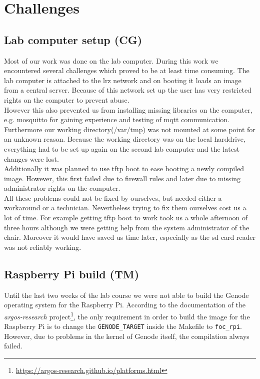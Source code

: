 \section{Challenges}
\label{sec:challenges}


\subsection{Lab computer setup (CG)}
Most of our work was done on the lab computer. During this work we encountered several challenges which proved to be at least time consuming. The lab computer is attached to the lrz network and on booting it loads an image from a central server. Because of this network set up the user has very restricted rights on the computer to prevent abuse.\\

However this also prevented us from installing missing libraries on the computer, e.g. mosquitto for gaining experience and testing of mqtt communication. Furthermore our working directory(/var/tmp) was not mounted at some point for an unknown reason. Because the working directory was on the local harddrive, everything had to be set up again on the second lab computer and the latest changes were lost.\\

Additionally it was planned to use tftp boot to ease booting a newly compiled image. However, this first failed due to firewall rules and later due to missing administrator rights on the computer.\\

All these problems could not be fixed by ourselves, but needed either a workaround or a technician. Nevertheless trying to fix them ourselves cost us a lot of time. For example getting tftp boot to work took us a whole afternoon of three hours although we were getting help from the system administrator of the chair. Moreover it would have saved us time later, especially as the sd card reader was not reliably working.


\subsection{Raspberry Pi build (TM)}
\label{sec:pi-problems}
Until the last two weeks of the lab course we were not able to build the Genode operating system for the Raspberry Pi. According to the documentation of the \textit{argos-research} project\footnote{\url{https://argos-research.github.io/platforms.html}}, the only requirement in order to build the image for the Raspberry Pi is to change the \texttt{GENODE\_TARGET} inside the Makefile to \texttt{foc\_rpi}. However, due to problems in the kernel of Genode itself, the compilation always failed. \\

